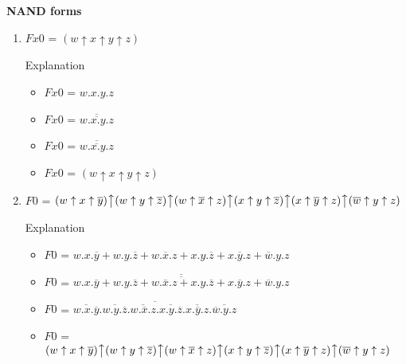  
 \textbf{ NAND forms  }
 \begin{enumerate}
 

    \item $Fx0$ = $(w\uparrow x\uparrow y\uparrow z)$

    Explanation
    \begin{itemize}
        \item $Fx0$ = $ w.x.y.z $

        
            \item  $Fx0$ = $\overline{\overline{ w.x.y.z }}$
        
            \item  $Fx0$ = $\overline{\overline{ w.x.y.z }}$
        
            \item  $Fx0$ = $(w\uparrow x\uparrow y\uparrow z)$
        
    \end{itemize}
 

    \item $F0$ = $(w\uparrow x\uparrow \overline{y})\big\uparrow (w\uparrow y\uparrow \overline{z})\big\uparrow (w\uparrow \overline{x}\uparrow z)\big\uparrow (x\uparrow y\uparrow \overline{z})\big\uparrow (x\uparrow \overline{y}\uparrow z)\big\uparrow (\overline{w}\uparrow y\uparrow z)$

    Explanation
    \begin{itemize}
        \item $F0$ = $ w.x.\overline{y} + w.y.\overline{z} + w.\overline{x}.z + x.y.\overline{z} + x.\overline{y}.z + \overline{w}.y.z $

        
            \item  $F0$ = $\overline{\overline{ w.x.\overline{y} + w.y.\overline{z} + w.\overline{x}.z + x.y.\overline{z} + x.\overline{y}.z + \overline{w}.y.z }}$
        
            \item  $F0$ = $\overline{\overline{ w.x.\overline{y} }.\overline{ w.y.\overline{z} }.\overline{ w.\overline{x}.z }.\overline{ x.y.\overline{z} }.\overline{ x.\overline{y}.z }.\overline{ \overline{w}.y.z }}$
        
            \item  $F0$ = $(w\uparrow x\uparrow \overline{y})\big\uparrow (w\uparrow y\uparrow \overline{z})\big\uparrow (w\uparrow \overline{x}\uparrow z)\big\uparrow (x\uparrow y\uparrow \overline{z})\big\uparrow (x\uparrow \overline{y}\uparrow z)\big\uparrow (\overline{w}\uparrow y\uparrow z)$
        

\end{itemize}
\end{enumerate}
